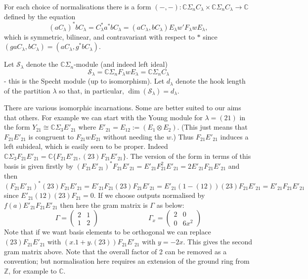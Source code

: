 \documentclass{article}
\theoremstyle{definition}
\newcommand{\beq}{\begin{equation}}
\newcommand{\eq}{\end{equation}}
\newcommand{\mat}[1]{\left(\begin{array}{#1}}
\newcommand{\tam}{\end{array}\right)}
\newcommand{\Sym}{\Sigma}  %
\def\SS{\mathcal{S}} %
\def\l{\lambda}
\def\C{\mathbb{C}}
\def\Z{\mathbb{Z}}
\numberwithin{equation}{subsection}
\begin{document}
For each choice of normalisations there is a form $(-,- ): \C\Sym_n C_\l \times \C\Sym_n C_\l \rightarrow \C $ 
defined by the equation
\beq (a C_\l)^* b C_\l=C_\l^* a^* b C_\l = ( a C_\l, b C_\l ) E_\l w' F_\l w E_\l, \label{eq:form}\eq
which is symmetric, bilinear, and contravariant with respect to $*$ since $( gaC_\l,bC_\l) = ( aC_\l,g^* bC_\l )$. 

Let  $\SS_\l$ denote the $\C\Sym_n$-module (and indeed left ideal) 
\beq  \label{eq:Specht0}
\SS_\l = \C \Sym_n  F_\l w E_\l   =   \C \Sym_n  C_\l
\eq 
- this is the Specht module (up to isomorphism). Let $d_\l$ denote the hook length of the partition $\l$ so that, in particular, $\dim(\SS_\l)=d_\l$.

There are various isomorphic incarnations. Some are better suited to our aims that others. 
For example 
we can start with the Young module for $\l=(21)$ in the form 
$Y_{21} \cong \C \Sym_3 E'_{21}$ where $E'_{21} =E_{12} := (E_1 \otimes E_2)$. 
(This just means that $F_{21} E'_{21}$ is congruent to $F_{21} w E_{21}$ without needing the $w$.) 
Thus $F_{21} E'_{21}$ induces a left subideal, which is easily seen to be proper. 
Indeed $\C\Sym_3  F_{21} E'_{21} = \C\{ F_{21} E'_{21} , (23) F_{21} E'_{21} \} $. 
The version of the form in terms of this basis is given firstly by 
$ ( F_{21} E'_{21} )^*  F_{21} E'_{21} =  E'_{21}  F_{21}^2 E'_{21}  
          = 2 E'_{21} F_{21} E'_{21}$
and then 
$ ( F_{21} E'_{21} )^*  (23)   F_{21} E'_{21} =  E'_{21}  F_{21} (23) F_{21} E'_{21}  
        =   E'_{21}  (1-(12)) (23) F_{21} E'_{21}   =  E'_{21} F_{21} E'_{21}$ 
since $ E'_{21} (12)(23) F_{21} =0$. 
If we choose outputs normalised by $f(a) E'_{21} F_{21} E'_{21} $ 
then here the gram matrix is $\Gamma$ as below: 
\[
\Gamma = \mat{cccc} 2&1 \\ 1&2 \tam     \hspace{3cm} 
\Gamma_x = \mat{cccc} 2&0 \\ 0&6x^2 \tam 
\]
Note that if we want basis elements to be orthogonal we can replace 
$(23) F_{21} E'_{21} $  with  $(x.1+y.(23)) F_{21} E'_{21} $ with $y=-2x$. 
This gives the second gram matrix above. 
Note that the overall factor of 2 can be removed as a convention; but normalisation here 
requires an extension of the ground ring from $\Z$, for example to $\C$. 
\end{document}
